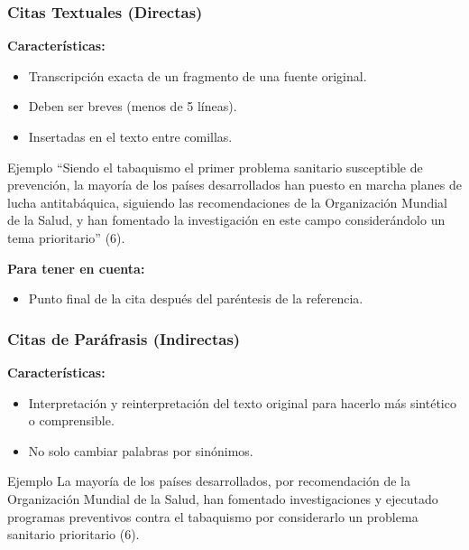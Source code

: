 \documentclass[
11pt, %
]{beamer}
\begin{document}
\begin{frame}
	\frametitle{Citas Textuales (Directas)}

	\textbf{Características:}
	\begin{itemize}
		\item Transcripción exacta de un fragmento de una fuente original.
		\item Deben ser breves (menos de 5 líneas).
		\item Insertadas en el texto entre comillas.
	\end{itemize}

	\begin{exampleblock}{Ejemplo}
		“Siendo el tabaquismo el primer problema sanitario susceptible de prevención, la mayoría de los países desarrollados han puesto en marcha planes de lucha antitabáquica, siguiendo las recomendaciones de la Organización Mundial de la Salud, y han fomentado la investigación en este campo considerándolo un tema prioritario” (6).
	\end{exampleblock}

	\textbf{Para tener en cuenta:}
	\begin{itemize}
		\item Punto final de la cita después del paréntesis de la referencia.
	\end{itemize}

\end{frame}

\begin{frame}
	\frametitle{Citas de Paráfrasis (Indirectas)}

	\textbf{Características:}
	\begin{itemize}
		\item Interpretación y reinterpretación del texto original para hacerlo más sintético o comprensible.
		\item No solo cambiar palabras por sinónimos.
	\end{itemize}

	\begin{exampleblock}{Ejemplo}
		La mayoría de los países desarrollados, por recomendación de la Organización Mundial de la Salud, han fomentado investigaciones y ejecutado programas preventivos contra el tabaquismo por considerarlo un problema sanitario prioritario (6).
	\end{exampleblock}

\end{frame}
\end{document}
